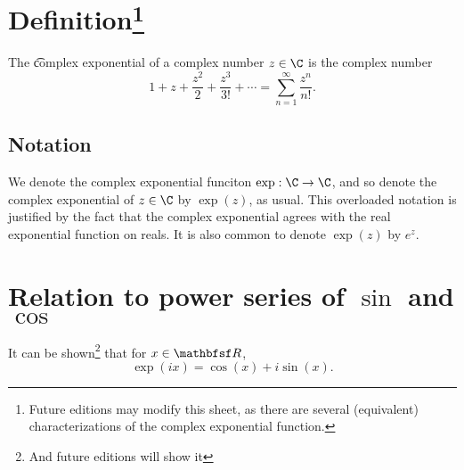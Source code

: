 

\section*{Definition\footnote{Future editions may modify this sheet, as there are several (equivalent) characterizations of the complex exponential function.}}

The \t{complex exponential} of a complex number $z \in \C $ is the complex number
\[
1 + z + \frac{z^2}{2} + \frac{z^3}{3!} + \cdots = \sum_{n = 1}^{\infty}\frac{z^n}{n!}.
\]

\subsection*{Notation}

We denote the complex exponential funciton $\exp: \C  \to \C $, and so denote the complex exponential of $z \in \C $ by $\exp(z)$, as usual.
This overloaded notation is justified by the fact that the complex exponential agrees with the real exponential function on reals.
It is also common to denote $\exp(z)$ by $e^z$.

\section*{Relation to power series of $\sin$ and $\cos$}

It can be shown\footnote{And future editions will show it}
that for $x \in \R $,
\[
\exp(ix) = \cos(x) + i \sin(x).
\]

\blankpage